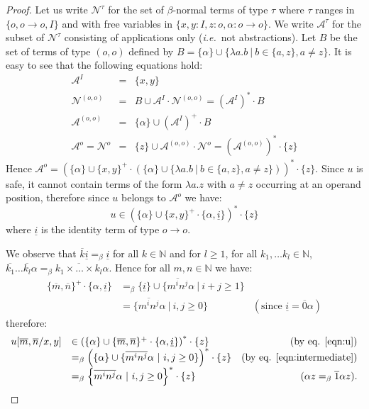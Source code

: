 \documentclass{llncs}
\newcommand{\encode}[1]{\overline{#1}} \newcommand\dps{\displaystyle}
\newcommand\union{\cup}
\newcommand\nat{\mathbb{N}}
\begin{document}
\begin{proof}
Let us write $\mathcal{N}^\tau$ for the set of $\beta$-normal terms of
type $\tau$ where $\tau$ ranges in $\{ o, o\rightarrow o, I \}$ and
with free variables in $\{ x,y:I, z:o, \alpha:o\rightarrow o\}$. We
write $\mathcal{A}^\tau$ for the subset of $\mathcal{N}^\tau$
consisting of applications only ({\it i.e.}~not abstractions).
Let $B$ be the set of terms of type $(o,o)$ defined by $B = \{ \alpha \} \union \{ \lambda a.b \ | \ b \in \{a,z\}, a \neq z \}$.
It is easy to see that the following equations hold:
\begin{eqnarray*}
\mathcal{A}^I &=& \{ x,y \} \\
\mathcal{N}^{(o,o)} &=& B \union \mathcal{A}^I \cdot
\mathcal{N}^{(o,o)} = (\mathcal{A}^I)^* \cdot B \\
\mathcal{A}^{(o,o)} &=& \{ \alpha \} \union (\mathcal{A}^I)^+ \cdot B \\
\mathcal{A}^o = \mathcal{N}^o &=& \{ z \} \union \mathcal{A}^{(o,o)} \cdot \mathcal{N}^o = (\mathcal{A}^{(o,o)})^* \cdot \{ z \}
\end{eqnarray*}
Hence $\mathcal{A}^o = \left( \{\alpha \} \union \{x,y\}^+ \cdot \left( \{\alpha \} \union \{\lambda a.b \ | \ b \in \{a,z\}, a \neq z \} \right) \right)^* \cdot \{ z \}$.
Since $u$ is safe, it cannot contain terms of the form $\lambda a . z$ with $a \neq z$ occurring at an operand position, therefore since $u$ belongs to $\mathcal{A}^o$ we have:
\begin{equation}
u \in \left( \{\alpha\} \union \{x,y\}^+ \cdot \{\alpha,
\underline{i} \} \right)^* \cdot \{ z \} \label{eqn:u}
\end{equation}
where $\underline{i}$ is the identity term of type $o\rightarrow o$.


We observe that $\encode{k} \underline{i} =_\beta \underline{i}$ for all $k \in \nat$ and for $l\geq 1$, for all $k_1, \ldots k_l \in \nat$,
$\encode{k_1}\ldots \encode{k_l} \alpha =_\beta
\encode{k_1\times \ldots \times k_l} \alpha$. Hence for all $m,n \in \nat$ we have:
\begin{equation}
\begin{array}{llr}
\{\encode{m},\encode{n}\}^+ \cdot \{\alpha, \underline{i} \} &=_\beta
\{ \underline{i} \} \union
\{ \encode{m^i n^j} \alpha \ |\ i+j \geq 1 \} \nonumber \\
&= \{ \encode{m^i n^j} \alpha \ |\ i,j \geq 0 \} & ( \mbox{since } \underline{i} = \encode{0} \alpha) \end{array}
\label{eqn:intermediate}
\end{equation}
therefore:
$$\begin{array}{llr}
u[\encode{m}, \encode{n}/x,y] &\in \left( \{ \alpha \} \union \{\encode{m},\encode{n}\}^+ \cdot \{\alpha, \underline{i} \} \right)^* \cdot \{ z \}  & \mbox{(by eq. \ref{eqn:u})} \\
&=_\beta \left( \{\alpha \} \union \{ \encode{m^i n^j}
\alpha \ | \ i,j \geq 0 \} \right)^* \cdot \{ z \} & \mbox{(by eq. \ref{eqn:intermediate})}  \\
&=_\beta \left\{ \encode{m^i n^j}
\alpha \ | \ i,j \geq 0 \right\}^* \cdot \{ z \} & \mbox{($\alpha z =_\beta \encode{1} \alpha z$)}.
\end{array}$$


\end{proof}
\end{document}
